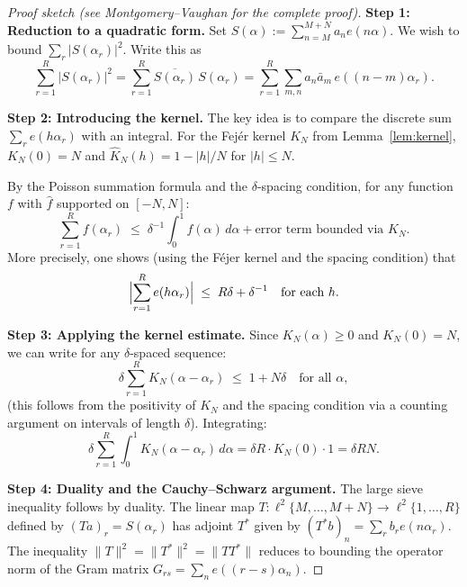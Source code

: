 \documentclass[12pt,a4paper]{amsart}
\theoremstyle{definition}
\newcommand{\eexp}[1]{e\!\left(#1\right)}
\begin{document}
\begin{proof}[Proof sketch (see Montgomery--Vaughan \cite{MV1973} for the complete proof)]
  \textbf{Step 1: Reduction to a quadratic form.}
  Set $S(\alpha) := \sum_{n=M}^{M+N}a_n\eexp{n\alpha}$.  We wish to bound
  $\sum_r |S(\alpha_r)|^2$.  Write this as
  \[
    \sum_{r=1}^{R}|S(\alpha_r)|^{2}
    = \sum_{r=1}^{R}\overline{S(\alpha_r)}\,S(\alpha_r)
    = \sum_{r=1}^{R}\sum_{m,n}a_n\bar{a}_m\,\eexp{(n-m)\alpha_r}.
  \]

  \textbf{Step 2: Introducing the kernel.}
  The key idea is to compare the discrete sum $\sum_r \eexp{h\alpha_r}$
  with an integral.  For the Fejér kernel $K_N$ from Lemma~\ref{lem:kernel},
  $K_N(0) = N$ and $\hat{K}_N(h) = 1 - |h|/N$ for $|h| \leq N$.

  By the Poisson summation formula and the $\delta$-spacing condition, for
  any function $f$ with $\hat{f}$ supported on $[-N, N]$:
  \[
    \sum_{r=1}^{R} f(\alpha_r)
    \;\leq\;
    \delta^{-1}\int_0^1 f(\alpha)\,d\alpha + \text{error term bounded via } K_N.
  \]
  More precisely, one shows (using the Féjer kernel and the spacing condition) that
  \[
    \Bigl|\sum_{r=1}^{R}\eexp{h\alpha_r}\Bigr|
    \;\leq\;
    R\delta + \delta^{-1} \quad \text{for each } h.
  \]

  \textbf{Step 3: Applying the kernel estimate.}
  Since $K_N(\alpha) \geq 0$ and $K_N(0) = N$, we can write for any
  $\delta$-spaced sequence:
  \[
    \delta\sum_{r=1}^{R}K_N(\alpha - \alpha_r)
    \;\leq\; 1 + N\delta
    \quad\text{for all }\alpha,
  \]
  (this follows from the positivity of $K_N$ and the spacing condition via
  a counting argument on intervals of length $\delta$).  Integrating:
  \[
    \delta\sum_{r=1}^{R}\int_0^1 K_N(\alpha-\alpha_r)\,d\alpha
    = \delta R \cdot K_N(0) \cdot 1 = \delta R N.
  \]

  \textbf{Step 4: Duality and the Cauchy--Schwarz argument.}
  The large sieve inequality follows by duality.  The linear map
  $T\colon \ell^2\{M,\ldots,M+N\} \to \ell^2\{1,\ldots,R\}$ defined by
  $(Ta)_r = S(\alpha_r)$ has adjoint $T^*$ given by
  $(T^* b)_n = \sum_r b_r \eexp{n\alpha_r}$.  The inequality
  $\|T\|^2 = \|T^*\|^2 = \|TT^*\|$ reduces to bounding the operator norm
  of the Gram matrix $G_{rs} = \sum_n \eexp{(r-s)\alpha_n}$.


\end{proof}
\end{document}

